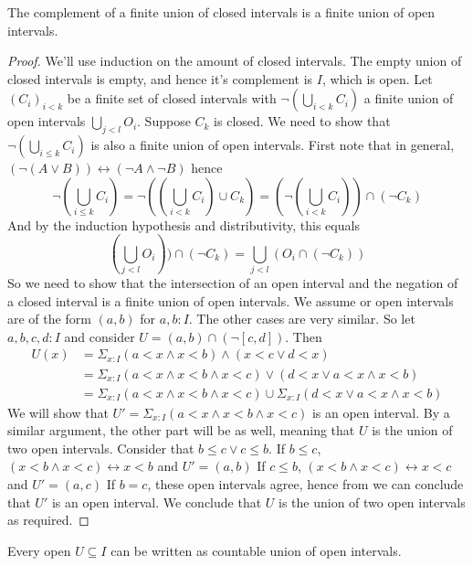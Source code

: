 \begin{lemma}\label{complementClosedIntervalOpenIntervals}
  The complement of a finite union of closed intervals is 
  a finite union of open intervals. 
\end{lemma}
\begin{proof}
  We'll use induction on the amount of closed intervals. 
  The empty union of closed intervals is empty, and hence it's complement is $I$, which is open. 
  Let $(C_i)_{i<k}$ be a finite set of closed intervals with $\neg (\bigcup_{i<k}C_i)$ 
  a finite union of open intervals $\bigcup_{j<l} O_i$. 
  Suppose $C_{k}$ is closed. We need to show that 
  $\neg (\bigcup_{i\leq k} C_i)$ is also a finite union of open intervals. 
  First note that in general, 
  $(\neg (A \vee B ))\leftrightarrow (\neg A \wedge \neg B)$
  hence 
  $$
  \neg (\bigcup_{i\leq k} C_i)
  = 
  \neg ((\bigcup_{i<k} C_i) \cup C_k) 
  =
  (\neg (\bigcup_{i<k} C_i) )\cap (\neg C_k) 
  $$
  And by the induction hypothesis and distributivity, this equals 
  $$
  (\bigcup_{j<l} O_i) ) \cap (\neg C_k) 
  =
  \bigcup_{j<l} (O_i \cap (\neg C_k) )
  $$
  So we need to show that the intersection of an open interval and the negation of a closed interval is a 
  finite union of open intervals. We assume or open intervals are of the form $(a,b)$ for $a,b:I$. 
  The other cases are very similar. 
  So let $a,b,c,d:I$ and consider 
  $U = (a,b) \cap (\neg [c,d])$. 
  Then 
  \begin{align} 
    U(x) &= \Sigma_{x:I}  
  (a < x \wedge x < b) \wedge ( x < c \vee d < x)\\
  &= \Sigma_{x:I}
  (a < x \wedge x < b \wedge x < c ) \vee ( d < x \vee a<x \wedge x < b)\\
  &= 
  \Sigma_{x:I}
  (a < x \wedge x < b \wedge x < c ) 
  \cup 
  \Sigma_{x:I}
  ( d < x \vee a<x \wedge x < b)
  \end{align} 
  We will show that 
  $U' = \Sigma_{x:I}(a < x \wedge x < b \wedge x < c ) $ is an open interval. 
  By a similar argument, the other part will be as well, meaning that $U$ is the union of two open intervals. 
  Consider that $b\leq c \vee c \leq b$. 
  If $b \leq c$, $(x<b \wedge x< c) \leftrightarrow x<b$ and $U' = (a,b)$
  If $c \leq b$, $(x<b \wedge x< c) \leftrightarrow x<c$ and $U' = (a,c)$
  If $b=c$, these open intervals agree, hence from  we can conclude that $U'$ is an open interval. 
  We conclude that $U$ is the union of two open intervals as required. 
\end{proof}
%
\begin{lemma}
  Every open $U\subseteq I$ can be written as countable union of open intervals.
\end{lemma} 
